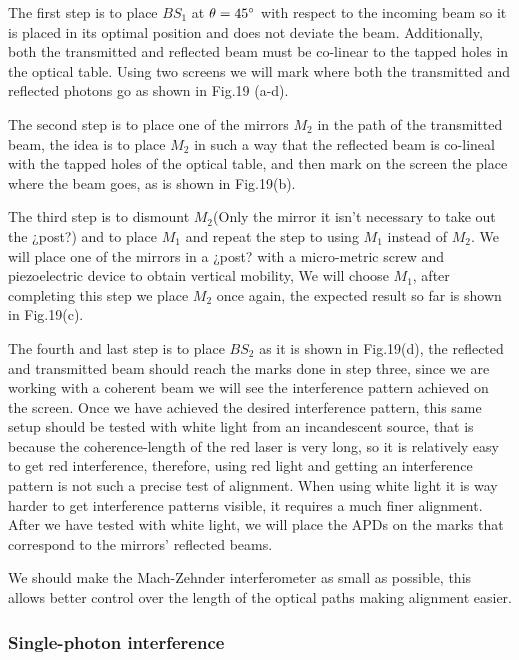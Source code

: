 \documentclass[12pt]{book}
\begin{document}
The first step is to place $BS_{1}$ at $\theta=45\degree$ with respect to the incoming beam so it is placed in its optimal position and does not deviate the beam. Additionally, both the transmitted and reflected beam must be co-linear to the tapped holes in the optical table. Using two screens we will mark where both the transmitted and reflected photons go as shown in Fig.19 (a-d).

The second step is to place one of the mirrors $M_{2}$ in the path of the transmitted beam, the idea is to place $M_{2}$ in such a way that the reflected beam is co-lineal with the tapped holes of the optical table, and then mark on the screen the place where the beam goes, as is shown in Fig.19(b).

The third step is to dismount $M_{2}$(Only the mirror it isn't necessary to take out the ¿post?) and to place $M_{1}$ and repeat the step to using $M_{1}$ instead of $M_{2}$. We will place one of the mirrors in a ¿post? with a micro-metric screw and piezoelectric device to obtain vertical mobility, We will choose $M_{1}$, after completing this step we place $M_{2}$ once again, the expected result so far is shown in Fig.19(c).

The fourth and last step is to place $BS_{2}$ as it is shown in Fig.19(d), the reflected and transmitted beam should reach the marks done in step three, since we are working with a coherent beam we will see the interference pattern achieved on the screen. Once we have achieved the desired interference pattern, this same setup should be tested with white light from an incandescent source, that is because the coherence-length of the red laser is very long, so it is relatively easy to get red interference, therefore, using red light and getting an interference pattern is not such a precise test of alignment. When using white light it is way harder to get interference patterns visible, it requires a much finer alignment. After we have tested with white light, we will place the APDs on the marks that correspond to the mirrors' reflected beams.


We should make the Mach-Zehnder interferometer as small as possible, this allows better control over the length of the optical paths making alignment easier.

\subsubsection{Single-photon interference}
\end{document}
